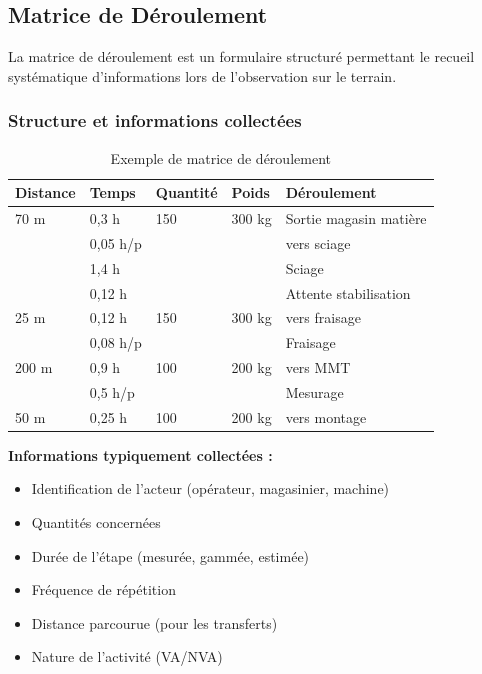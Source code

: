 \documentclass[a4paper,12pt]{article}
\begin{document}
\subsection{Matrice de Déroulement}

La matrice de déroulement est un formulaire structuré permettant le recueil systématique d'informations lors de l'observation sur le terrain.

\subsubsection{Structure et informations collectées}

\begin{table}[ht]
\centering
\begin{tabular}{|p{2.5cm}|p{2.5cm}|p{2.5cm}|p{2.5cm}|p{4cm}|}
\hline
\textbf{Distance} & \textbf{Temps} & \textbf{Quantité} & \textbf{Poids} & \textbf{Déroulement} \\
\hline
70 m & 0,3 h & 150 & 300 kg & Sortie magasin matière \\
\hline
& 0,05 h/p & & & vers sciage \\
\hline
& 1,4 h & & & Sciage \\
\hline
& 0,12 h & & & Attente stabilisation \\
\hline
25 m & 0,12 h & 150 & 300 kg & vers fraisage \\
\hline
& 0,08 h/p & & & Fraisage \\
\hline
200 m & 0,9 h & 100 & 200 kg & vers MMT \\
\hline
& 0,5 h/p & & & Mesurage \\
\hline
50 m & 0,25 h & 100 & 200 kg & vers montage \\
\hline
\end{tabular}
\caption{Exemple de matrice de déroulement}
\end{table}

\textbf{Informations typiquement collectées :}
\begin{itemize}
    \item Identification de l'acteur (opérateur, magasinier, machine)
    \item Quantités concernées
    \item Durée de l'étape (mesurée, gammée, estimée)
    \item Fréquence de répétition
    \item Distance parcourue (pour les transferts)
    \item Nature de l'activité (VA/NVA)
\end{itemize}
\end{document}
